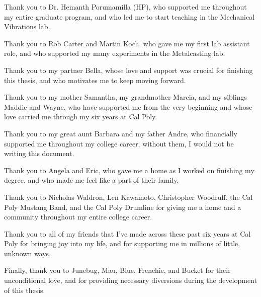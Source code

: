 \documentclass[11pt]{ucthesisCP}
\begin{document}
\begin{frontmatter}
\begin{acknowledgements}
		Thank you to Dr. Hemanth Porumamilla (HP), who supported me throughout my entire graduate program, and who led me to start teaching in the Mechanical Vibrations lab.
		
		Thank you to Rob Carter and Martin Koch, who gave me my first lab assistant role, and who supported my many experiments in the Metalcasting lab.
		
		Thank you to my partner Bella, whose love and support was crucial for finishing this thesis, and who motivates me to keep moving forward.
		
		Thank you to my mother Samantha, my grandmother Marcia, and my siblings Maddie and Wayne, who have supported me from the very beginning and whose love carried me through my six years at Cal Poly.
		
		Thank you to my great aunt Barbara and my father Andre, who financially supported me throughout my college career; without them, I would not be writing this document.
		
		Thank you to Angela and Eric, who gave me a home as I worked on finishing my degree, and who made me feel like a part of their family.
		
		Thank you to Nicholas Waldron, Len Kawamoto, Christopher Woodruff, the Cal Poly Mustang Band, and the Cal Poly Drumline for giving me a home and a community throughout my entire college career.
		
		Thank you to all of my friends that I've made across these past six years at Cal Poly for bringing joy into my life, and for supporting me in millions of little, unknown ways.
		
		Finally, thank you to Junebug, Mau, Blue, Frenchie, and Bucket for their unconditional love, and for providing necessary diversions during the development of this thesis.
		
	\end{acknowledgements}
	
	
	\tableofcontents
	
	
	\listoftables
	
	\listoffigures
	
\end{frontmatter}

\pagestyle{plain}

\renewcommand{\baselinestretch}{1.66}





\end{document}
